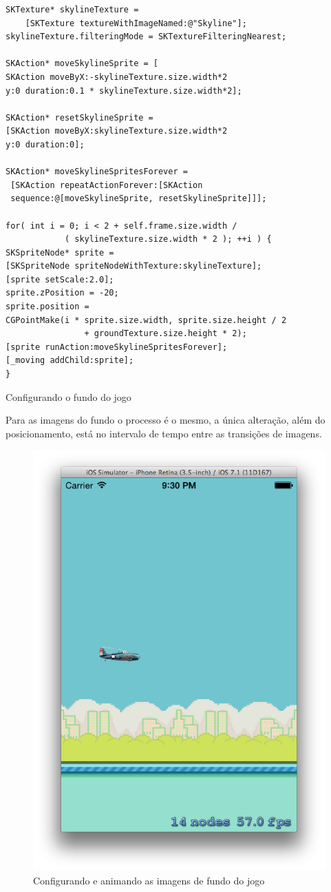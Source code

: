\documentclass[a4paper,12pt,brazil,oneside]{book}
\begin{document}
\begin{listing}[H]
\begin{verbatim}
SKTexture* skylineTexture = 
	[SKTexture textureWithImageNamed:@"Skyline"];
skylineTexture.filteringMode = SKTextureFilteringNearest;
        
SKAction* moveSkylineSprite = [
SKAction moveByX:-skylineTexture.size.width*2 
y:0 duration:0.1 * skylineTexture.size.width*2];

SKAction* resetSkylineSprite = 
[SKAction moveByX:skylineTexture.size.width*2 
y:0 duration:0];

SKAction* moveSkylineSpritesForever =
 [SKAction repeatActionForever:[SKAction 
 sequence:@[moveSkylineSprite, resetSkylineSprite]]];
        
for( int i = 0; i < 2 + self.frame.size.width / 
			( skylineTexture.size.width * 2 ); ++i ) {
SKSpriteNode* sprite = 
[SKSpriteNode spriteNodeWithTexture:skylineTexture];
[sprite setScale:2.0];
sprite.zPosition = -20;
sprite.position = 
CGPointMake(i * sprite.size.width, sprite.size.height / 2 
				+ groundTexture.size.height * 2);
[sprite runAction:moveSkylineSpritesForever];
[_moving addChild:sprite];
}
\end{verbatim}
\caption{Configurando o fundo do jogo}
\end{listing}

Para as imagens do fundo o processo é o mesmo, a única alteração, além do posicionamento, está no intervalo de tempo entre as transições de imagens.

\begin{figure}[H]
  \centering
  \includegraphics[width=.75\textwidth]{figuras/6/plane5.png}
  \caption{Configurando e animando as imagens de fundo do jogo}
  \label{fig:a}
\end{figure}
\end{document}
